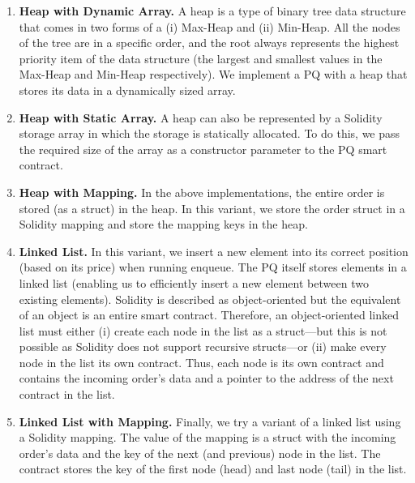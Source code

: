 \begin{enumerate}

\item \textbf{Heap with Dynamic Array.} A heap is a type of binary tree data structure that comes in two forms of a (i) Max-Heap and (ii) Min-Heap. All the nodes of the tree are in a specific order, and the root always represents the highest priority item of the data structure (the largest and smallest values in the Max-Heap and Min-Heap respectively). We implement a PQ with a heap that stores its data in a dynamically sized array. 

\item \textbf{Heap with Static Array.} A heap can also be represented by a Solidity storage array in which the storage is statically allocated. To do this, we pass the required size of the array as a constructor parameter to the PQ smart contract. 

\item \textbf{Heap with Mapping.} In the above implementations, the entire order is stored (as a struct) in the heap. In this variant, we store the order struct in a Solidity mapping and store the mapping keys in the heap.  

\item \textbf{Linked List.} In this variant, we insert a new element into its correct position (based on its price) when running enqueue. The PQ itself stores elements in a linked list (enabling us to efficiently insert a new element between two existing elements). Solidity is described as object-oriented but the equivalent of an object is an entire smart contract. Therefore, an object-oriented linked list must either (i) create each node in the list as a struct---but this is not possible as Solidity does not support recursive structs---or (ii) make every node in the list its own contract.  Thus, each node is its own contract and contains the incoming order's data and a pointer to the address of the next contract in the list.

\item \textbf{Linked List with Mapping.} Finally, we try a variant of a linked list using a Solidity mapping. The value of the mapping is a struct with the incoming order's data and the key of the next (and previous) node in the list. The contract stores the key of the first node (head) and last node (tail) in the list. 

\end{enumerate}

